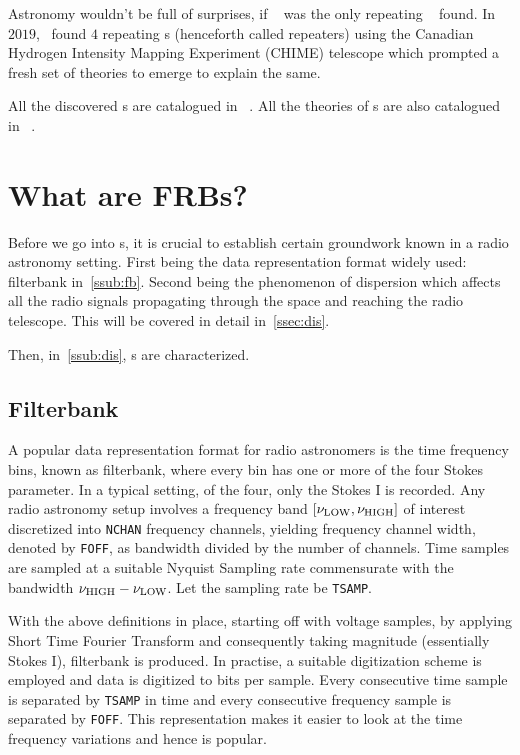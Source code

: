 \par Astronomy wouldn't be full of surprises, if ~ was the only repeating \frb{}~ found. In $2019$,~\cite{chime_repeaters} found $4$ repeating \frb{}s (henceforth called repeaters) using the Canadian Hydrogen Intensity Mapping Experiment (CHIME) telescope which prompted a fresh set of theories to emerge to explain the same.

\par All the discovered \frb{}s are catalogued in ~\cite{frbcat}. All the theories of \frb{}s are also catalogued in ~\cite{frbtheorycat}.


\section{What are FRBs?}

\par Before we go into \frb{}s, it is crucial to establish certain groundwork known in a radio astronomy setting. 
First being the data representation format widely used: filterbank in~\autoref{ssub:fb}. 
Second being the phenomenon of dispersion which affects all the radio signals propagating through the space and reaching the radio telescope. 
This will be covered in detail in~\autoref{ssec:dis}.

\par Then, in~\autoref{ssub:dis}, \frb{}s are characterized.

\subsection{Filterbank}
\label{ssub:fb}

\par A popular data representation format for radio astronomers is the time frequency bins, known as filterbank, where every bin has one or more of the four Stokes parameter. In a typical setting, of the four, only the Stokes I is recorded.
Any radio astronomy setup involves a frequency band $[\nu_{\rm LOW}, \nu_{\rm HIGH}]$ of interest discretized into \texttt{NCHAN} frequency channels, yielding frequency channel width, denoted by \texttt{FOFF}, as bandwidth divided by the number of channels.
Time samples are sampled at a suitable Nyquist Sampling rate commensurate with the bandwidth $\nu_{\rm HIGH} - \nu_{\rm LOW}$. Let the sampling rate be \texttt{TSAMP}.

\par With the above definitions in place, starting off with voltage samples, by applying Short Time Fourier Transform and consequently taking magnitude (essentially Stokes I), filterbank is produced. In practise, a suitable digitization scheme is employed and data is digitized to  bits per sample.
Every consecutive time sample is separated by \texttt{TSAMP} in time and every consecutive frequency sample is separated by \texttt{FOFF}.
This representation makes it easier to look at the time frequency variations and hence is popular.

